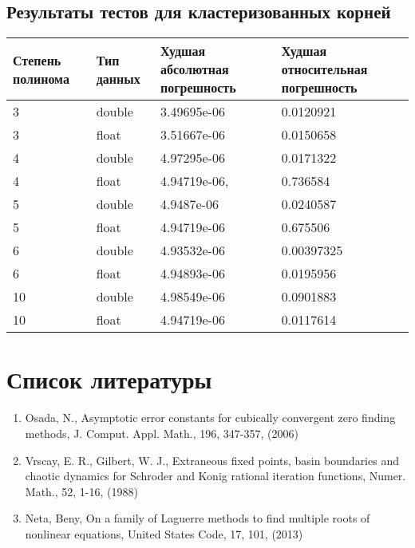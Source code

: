 \documentclass[a4paper,12pt]{article}
\begin{document}
\subsection{Результаты тестов для кластеризованных корней}
\begin{center}
  \begin{tabular}{|p{2.5cm}|p{3.0cm}|p{5.0cm}|p{5.0cm}|}
  \hline
  \textbf{Степень полинома}  & \textbf{Тип данных} & \textbf{Худшая абсолютная погрешность} & \textbf{Худшая относительная погрешность} \\
  \hline
  3 & double & 3.49695e-06 & 0.0120921 \\
  \hline
  3 & float & 3.51667e-06 & 0.0150658 \\
  \hline
  4 & double & 4.97295e-06 & 0.0171322 \\
  \hline
  4 & float & 4.94719e-06, & 0.736584 \\
  \hline
  5 & double & 4.9487e-06 & 0.0240587 \\
  \hline
  5 & float & 4.94719e-06 & 0.675506 \\
  \hline
  6 & double & 4.93532e-06 & 0.00397325 \\
  \hline
  6 & float & 4.94893e-06 & 0.0195956 \\
  \hline
  10 & double & 4.98549e-06 & 0.0901883 \\
  \hline
  10 & float & 4.94719e-06 & 0.0117614 \\
  \hline
\end{tabular}
\label{tab:my_label_2}
\end{center}

\newpage

\section{Список литературы}
\begin{enumerate}
    \item Osada, N., Asymptotic error constants for cubically convergent zero finding methods, J. Comput. Appl. Math., 196, 347-357, (2006)
    \item Vrscay, E. R., Gilbert, W. J., Extraneous fixed points, basin boundaries and chaotic dynamics for Schroder and Konig rational iteration functions, Numer. Math., 52, 1-16, (1988)
    \item Neta, Beny, On a family of Laguerre methods to find multiple roots of nonlinear equations, United States Code, 17, 101, (2013)
\end{enumerate}
\end{document}
